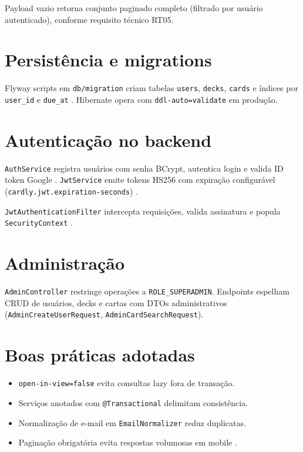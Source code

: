 Payload vazio retorna conjunto paginado completo (filtrado por usuário autenticado), conforme requisito técnico RT05.

\section{Persistência e migrations}

Flyway scripts em \texttt{db/migration} criam tabelas \texttt{users}, \texttt{decks}, \texttt{cards} e índices por \texttt{user\_id} e \texttt{due\_at} \cite{flyway_docs}. Hibernate opera com \texttt{ddl-auto=validate} em produção.

\section{Autenticação no backend}

\texttt{AuthService} registra usuários com senha BCrypt, autentica login e valida ID token Google \cite{bcrypt_spring,google_oauth}. \texttt{JwtService} emite tokens HS256 com expiração configurável (\texttt{cardly.jwt.expiration-seconds}) \cite{jwt_io}.

\texttt{JwtAuthenticationFilter} intercepta requisições, valida assinatura e popula \texttt{SecurityContext} \cite{spring_security_jwt,stackoverflow_jwt_spring}.

\section{Administração}

\texttt{AdminController} restringe operações a \texttt{ROLE\_SUPERADMIN}. Endpoints espelham CRUD de usuários, decks e cartas com DTOs administrativos (\texttt{AdminCreateUserRequest}, \texttt{AdminCardSearchRequest}).

\section{Boas práticas adotadas}

\begin{itemize}
    \item \texttt{open-in-view=false} evita consultas lazy fora de transação.
    \item Serviços anotados com \texttt{@Transactional} delimitam consistência.
    \item Normalização de e-mail em \texttt{EmailNormalizer} reduz duplicatas.
    \item Paginação obrigatória evita respostas volumosas em mobile \cite{pressman2020}.
\end{itemize}

